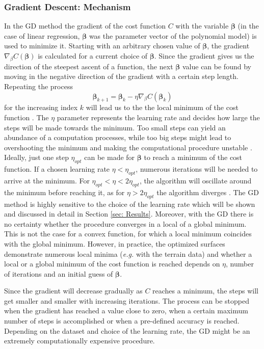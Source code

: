 \documentclass{emulateapj}
\begin{document}
\subsubsection{Gradient Descent: Mechanism}
\label{subsubsec: GD}

In the GD method the gradient of the cost function $C$ with the variable $\boldsymbol{\beta}$ (in the case of linear regression, $\boldsymbol{\beta}$ was the parameter vector of the polynomial model) is used to minimize it. Starting with an arbitrary chosen value of $\boldsymbol{\beta}$, the gradient $\nabla_\beta C(\boldsymbol{\beta})$ is calculated for a current choice of $\boldsymbol{\beta}$. Since the gradient gives us the direction of the steepest ascent of a function, the next $\boldsymbol{\beta}$ value can be found by moving in the negative direction of the gradient with a certain step length. Repeating the process
\begin{equation}
    \boldsymbol{\beta}_{k+1} = \boldsymbol{\beta}_k - \eta\nabla_\beta C(\boldsymbol{\beta}_k)
\end{equation}
for the increasing index $k$ will lead us to the the local minimum of the cost function \cite{Morten}. The $\eta$ parameter represents the learning rate and decides how large the steps will be made towards the minimum. Too small steps can yield an abundance of a computation processes, while too big steps might lead to overshooting the minimum and making the computational procedure unstable \cite{high bias}. Ideally, just one step $\eta_{opt}$ can be made for $\boldsymbol{\beta}$ to reach a minimum of the cost function. If a chosen learning rate $\eta<\eta_{opt}$, numerous iterations will be needed to arrive at the minimum. For $\eta_{opt}<\eta<2\eta_{opt}$, the algorithm will oscillate around the minimum before reaching it, as for $\eta>2\eta_{opt}$ the algorithm diverges \cite{high bias}. The GD method is highly sensitive to the choice of the learning rate which will be shown and discussed in detail in Section \ref{sec: Results}. Moreover, with the GD there is no certainty whether the procedure converges in a local of a global minimum. This is not the case for a convex function, for which a local minimum coincides with the global minimum. However, in practice, the optimized surfaces demonstrate numerous local minima (\textit{e.g.} with the terrain data) and whether a local or a global minimum of the cost function is reached depends on $\eta$, number of iterations and an initial guess of $\boldsymbol{\beta}$.

Since the gradient will decrease gradually as $C$ reaches a minimum, the steps will get smaller and smaller with increasing iterations. The process can be stopped when the gradient has reached a value close to zero, when a certain maximum number of steps is accomplished or when a pre-defined accuracy is reached. Depending on the dataset and choice of the learning rate, the GD might be an extremely computationally expensive procedure.
\end{document}
